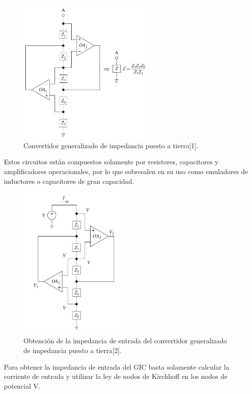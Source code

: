 \documentclass[a4paper]{article}
\begin{document}
\begin{figure} [H]
	\centering
	\includegraphics[width=0.6\textwidth]{Imagenes/gic.PNG}
	\caption{Convertidor generalizado de impedancia puesto a tierra[1].}
	\label{fig:gic}
\end{figure}

Estos circuitos están compuestos solamente por resistores, capacitores y amplificadores operacionales, por lo que sobresalen en su uso como emuladores de inductores o capacitores de gran capacidad.

\begin{figure}[H]
	\centering
	\includegraphics[width=0.5\textwidth]{Imagenes/gic_zin.PNG}
	\caption{Obtención de la impedancia de entrada del convertidor generalizado de impedancia puesto a tierra[2].}
	\label{fig:gic}
\end{figure}

Para obtener la impedancia de entrada del GIC basta solamente calcular la corriente de entrada y utilizar la ley de nodos de Kirchhoff en los nodos de potencial V.
\end{document}
